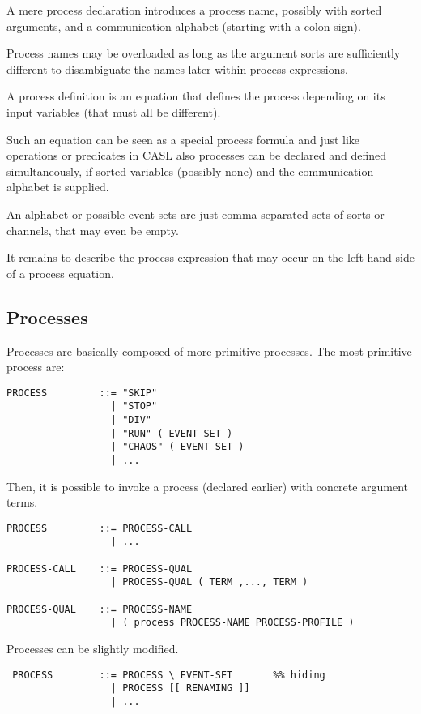 \documentclass{article}
\begin{document}
A mere process declaration introduces a process name, possibly with sorted
arguments, and a communication alphabet (starting with a colon sign).

Process names may be overloaded as long as the argument sorts are sufficiently
different to disambiguate the names later within process expressions.

A process definition is an equation that defines the process depending on its
input variables (that must all be different).

Such an equation can be seen as a special process formula and just like
operations or predicates in CASL also processes can be declared and defined
simultaneously, if sorted variables (possibly none) and the communication
alphabet is supplied.

An alphabet or possible event sets are just comma separated sets of sorts or
channels, that may even be empty.

It remains to describe the process expression that may occur on the left hand
side of a process equation.

\subsection{Processes}

Processes are basically composed of more primitive processes. The most
primitive process are:

\begin{verbatim}
PROCESS         ::= "SKIP"
                  | "STOP"
                  | "DIV"
                  | "RUN" ( EVENT-SET )
                  | "CHAOS" ( EVENT-SET )
                  | ...
\end{verbatim}

Then, it is possible to invoke a process (declared earlier) with concrete
argument terms.

\begin{verbatim}
PROCESS         ::= PROCESS-CALL
                  | ...

PROCESS-CALL    ::= PROCESS-QUAL
                  | PROCESS-QUAL ( TERM ,..., TERM )

PROCESS-QUAL    ::= PROCESS-NAME
                  | ( process PROCESS-NAME PROCESS-PROFILE )
\end{verbatim}

Processes can be slightly modified.

\begin{verbatim}
 PROCESS        ::= PROCESS \ EVENT-SET       %% hiding
                  | PROCESS [[ RENAMING ]]
                  | ...
\end{verbatim}
\end{document}
